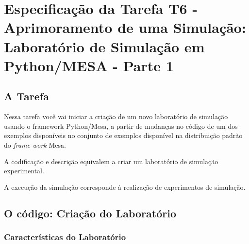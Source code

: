 \chapter{Especificação da Tarefa T6 - Aprimoramento de uma Simulação: Laboratório de Simulação em Python/MESA - Parte 1\label{chap:tar4.1-criacao:lab}}

\section{A Tarefa} 

Nessa tarefa você vai iniciar a criação de um novo laboratório de simulação
usando o framework Python/Mesa, a partir de mudanças no código de um dos exemplos disponíveis no conjunto de exemplos disponível na distribuição padrão do \textit{frame
work} Mesa.

A codificação e descrição equivalem a criar um laboratório de simulação experimental.

A execução da simulação corresponde à realização de experimentos de simulação.

\section{O código: Criação do Laboratório}

\subsection{Características do Laboratório}

